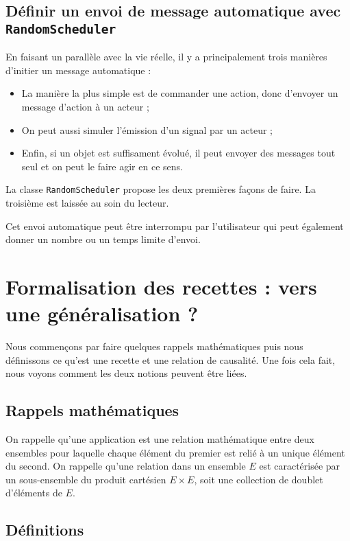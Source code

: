 \documentclass[11pt]{article}
\begin{document}
\subsection{Définir un envoi de message automatique avec \texttt{RandomScheduler}}

En faisant un parallèle avec la vie réelle, il y a principalement trois manières d'initier un message automatique :
\begin{itemize}
\item La manière la plus simple est de commander une action, donc d'envoyer un message d'action à un acteur ;
\item On peut aussi simuler l'émission d'un signal par un acteur ;
\item Enfin, si un objet est suffisament évolué, il peut envoyer des messages tout seul et on peut le faire agir en ce sens.
\end{itemize}

La classe \texttt{RandomScheduler} propose les deux premières façons de faire. La troisième est laissée au soin du lecteur.

Cet envoi automatique peut être interrompu par l'utilisateur qui peut également donner un nombre ou un temps limite d'envoi.

\section{Formalisation des recettes : vers une généralisation ?}

Nous commençons par faire quelques rappels mathématiques puis nous définissons ce qu'est une recette et une relation de causalité. Une fois cela fait, nous voyons comment les deux notions peuvent être liées.

\subsection{Rappels mathématiques}

On rappelle qu'une application est une relation mathématique entre deux ensembles pour laquelle chaque élément du premier est relié à un unique élément du second. On rappelle qu'une relation dans un ensemble $E$ est caractérisée par un sous-ensemble du produit cartésien $E × E$, soit une collection de doublet d'éléments de $E$.

\subsection{Définitions}
\end{document}
